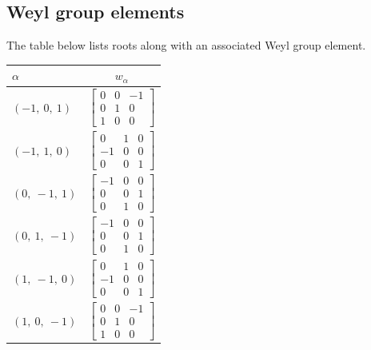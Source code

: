 \documentclass[11pt]{article}
\newcommand{\noi}{\noindent}
\theoremstyle{definition}
\begin{document}
\subsection{Weyl group elements}

\noi The table below lists roots along with an associated Weyl group element.

\bigskip

\noi \noindent \begin{longtable}{|l|c|}
    \hline
    $\alpha$ & $w_\alpha$ \\
    \hline
    \endhead
    $\left( -1, \  0, \  1\right)$ & ${\left[\begin{matrix}0 & 0 & -1\\0 & 1 & 0\\1 & 0 & 0\end{matrix}\right]}$ \\
    \hline
    $\left( -1, \  1, \  0\right)$ & ${\left[\begin{matrix}0 & 1 & 0\\-1 & 0 & 0\\0 & 0 & 1\end{matrix}\right]}$ \\
    \hline
    $\left( 0, \  -1, \  1\right)$ & ${\left[\begin{matrix}-1 & 0 & 0\\0 & 0 & 1\\0 & 1 & 0\end{matrix}\right]}$ \\
    \hline
    $\left( 0, \  1, \  -1\right)$ & ${\left[\begin{matrix}-1 & 0 & 0\\0 & 0 & 1\\0 & 1 & 0\end{matrix}\right]}$ \\
    \hline
    $\left( 1, \  -1, \  0\right)$ & ${\left[\begin{matrix}0 & 1 & 0\\-1 & 0 & 0\\0 & 0 & 1\end{matrix}\right]}$ \\
    \hline
    $\left( 1, \  0, \  -1\right)$ & ${\left[\begin{matrix}0 & 0 & -1\\0 & 1 & 0\\1 & 0 & 0\end{matrix}\right]}$ \\
    \hline
\end{longtable}
\end{document}
